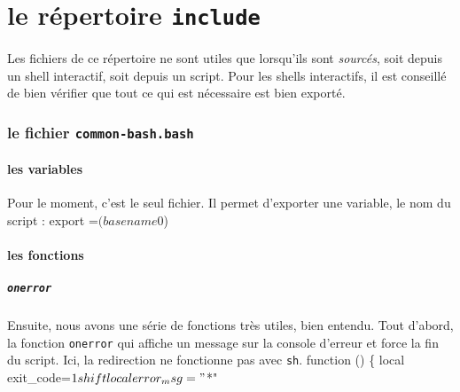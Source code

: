 \documentclass{scrartcl}%
\begin{document}
\part{le répertoire \texttt{include}}

Les fichiers de ce répertoire ne sont utiles que lorsqu'ils sont \emph{sourcés}, soit depuis un shell interactif, soit depuis un script. Pour les shells interactifs, il est conseillé de bien vérifier que tout ce qui est nécessaire est bien exporté.

\section{le fichier \texttt{common-bash.bash}}
\subsection{les variables}
Pour le moment, c'est le seul fichier. Il permet d'exporter une variable, le nom du script :
\nwenddocs{}\endmoddef\nwstartdeflinemarkup{}\nwenddeflinemarkup
export =$(basename $0)
\eatline
{}\nwendcode{}\nwdocspar
\subsection{les fonctions}
\subsubsection{\texttt{onerror}}
Ensuite, nous avons une série de fonctions très utiles, bien entendu. Tout d'abord, la fonction \texttt{onerror} qui affiche un message sur la console d'erreur et force la fin du script. Ici, la redirection ne fonctionne pas avec \texttt{sh}.
\nwenddocs{}\endmoddef\nwstartdeflinemarkup{}\nwenddeflinemarkup
function () \{
    local exit_code=$1
    shift
    local error_msg="$*"
\end{document}
